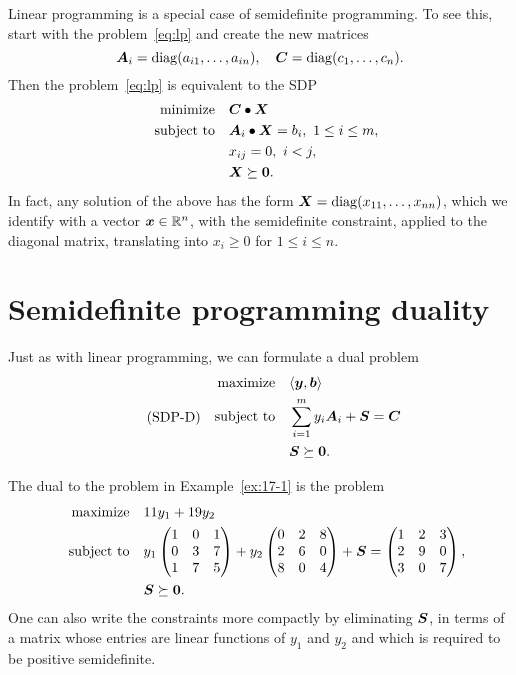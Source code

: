 Linear programming is a special case of semidefinite programming. To see this, start with the problem~\eqref{eq:lp} and create the new matrices
\begin{equation*}
 \bm{A}_i = \mathrm{diag}(a_{i1},\dots,a_{in}), \quad \bm{C} = \mathrm{diag}(c_1,\dots,c_n).
\end{equation*}
Then the problem~\eqref{eq:lp} is equivalent to the SDP
\begin{align*}
 \text{minimize}\quad & \bm{C}\bullet \bm{X}\\
 \quad\text{subject to}\quad & \bm{A}_i\bullet \bm{X} = b_i, \ 1\leq i\leq m,\\
 & x_{ij}=0, \ i<j,\\
 & \bm{X}\succeq \bm{0}.
\end{align*}
In fact, any solution of the above has the form $\bm{X}=\mathrm{diag}(x_{11},\dots,x_{nn})$, which we identify with a vector $\bm{x}\in \mathbb{R}^n$, with the semidefinite constraint, applied to the diagonal matrix, translating into $x_i\geq 0$ for $1\leq i\leq n$.

\section{Semidefinite programming duality}
Just as with linear programming, we can formulate a dual problem
\begin{align}\label{eq:sdp-d}\tag{SDP-D}
 \begin{split}
  \text{maximize}\quad & \langle {\bm{y}}, {\bm{b}} \rangle\\
  \quad\text{subject to}\quad & \sum_{i=1}^m y_i \bm{A}_i + \bm{S}=\bm{C}\\
  & \bm{S}\succeq \bm{0}.
 \end{split}
\end{align}

\begin{example}
 The dual to the problem in Example~\ref{ex:17-1} is the problem
 \begin{align*}
  \text{maximize}\quad & 11y_1+19y_2\\
  \quad\text{subject to}\quad & y_1\begin{pmatrix}
                1 & 0 & 1\\
                0 & 3 & 7\\
                1 & 7 & 5
               \end{pmatrix}
	+ y_2 \begin{pmatrix}
	       0 & 2 & 8\\
	       2 & 6 & 0\\
	       8 & 0 & 4
	      \end{pmatrix}
 + \bm{S} = 
\begin{pmatrix}
 1 & 2 & 3\\
 2 & 9 & 0\\
 3 & 0 & 7
\end{pmatrix},\\
& \bm{S}\succeq \bm{0}.
 \end{align*}
 One can also write the constraints more compactly by eliminating $\bm{S}$, in terms of a matrix whose entries are linear functions of $y_1$ and $y_2$ and which is required to be positive semidefinite.
\end{example}

